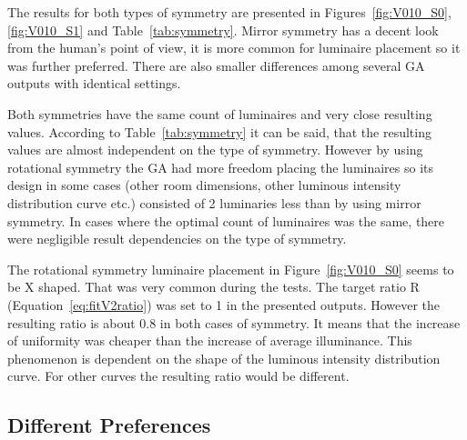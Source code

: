 The results for both types of symmetry are presented in Figures~\ref{fig:V010_S0}, \ref{fig:V010_S1} and Table~\ref{tab:symmetry}. Mirror symmetry has a decent look from the human's point of view, it is more common for luminaire placement so it was further preferred. There are also smaller differences among several GA outputs with identical settings.

Both symmetries have the same count of luminaires and very close resulting values. According to Table~\ref{tab:symmetry} it can be said, that the resulting values are almost independent on the type of symmetry. However by using rotational symmetry the GA had more freedom placing the luminaires so its design in some cases (other room dimensions, other luminous intensity distribution curve etc.) consisted of 2 luminaries less than by using mirror symmetry. In cases where the optimal count of luminaires was the same, there were negligible result dependencies on the type of symmetry.

The rotational symmetry luminaire placement in Figure~\ref{fig:V010_S0} seems to be X shaped. That was very common during the tests. The target ratio R (Equation~\ref{eq:fitV2ratio}) was set to 1 in the presented outputs. However the resulting ratio is about 0.8 in both cases of symmetry. It means that the increase of uniformity was cheaper than the increase of average illuminance. This phenomenon is dependent on the shape of the luminous intensity distribution curve. For other curves the resulting ratio would be different.


\subsection{Different Preferences}

